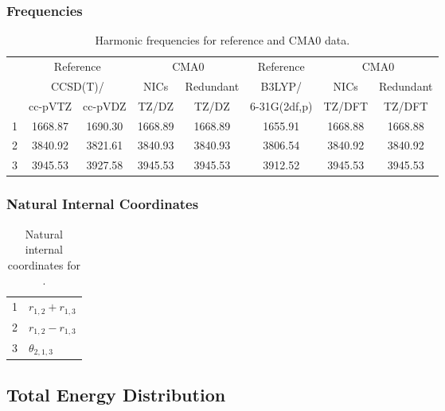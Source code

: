 \documentclass[10pt,oneside]{article}
\begin{document}
\begin{table}[h!]
\subsubsection*{Frequencies}
\centering
\caption{Harmonic frequencies for reference and CMA0 data.}
\begin{tabular}{cccccccc}
\toprule
{} & \multicolumn{2}{c}{Reference} & \multicolumn{2}{c}{CMA0} &    Reference & \multicolumn{2}{c}{CMA0} \\
{} & \multicolumn{2}{c}{CCSD(T)/} &    NICs &  Redundant &       B3LYP/ &    NICs & Redundant \\
{} &   cc-pVTZ & cc-pVDZ &   TZ/DZ &      TZ/DZ & 6-31G(2df,p) &  TZ/DFT &    TZ/DFT \\
\midrule
1 &   1668.87 & 1690.30 & 1668.89 &    1668.89 &      1655.91 & 1668.88 &   1668.88 \\
2 &   3840.92 & 3821.61 & 3840.93 &    3840.93 &      3806.54 & 3840.92 &   3840.92 \\
3 &   3945.53 & 3927.58 & 3945.53 &    3945.53 &      3912.52 & 3945.53 &   3945.53 \\
\bottomrule
\end{tabular}
\end{table}

\begin{table}[h!]
\subsubsection*{Natural Internal Coordinates}
\centering
\caption{Natural internal coordinates for .}
\small
\begin{tabular}{ll}
\toprule
  1   & $r_{1,2} + r_{1,3}$ \\
  2   & $r_{1,2} - r_{1,3}$ \\
  3   & $\theta_{2,1,3}$ \\
\bottomrule
\end{tabular}
\end{table}

\begin{table}
\subsection*{Total Energy Distribution}
\centering\end{table}

\clearpage

\subsection{}
\end{document}
